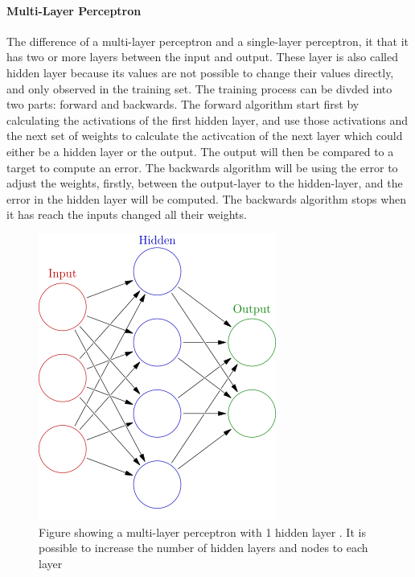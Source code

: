 \documentclass[USenglish]{ifimaster}  %
\begin{document}
\paragraph{Multi-Layer Perceptron}
The difference of a multi-layer perceptron and a single-layer perceptron, it that it has two or more layers between the input and output. These layer is also called hidden layer because its values are not possible to change their values directly, and only observed in the training set. The training process can be divded into two parts: forward and backwards. The forward algorithm start first by calculating the activations of the first hidden layer, and use those activations and the next set of weights to calculate the activcation of the next layer which could either be a hidden layer or the output. The output will then be compared to a target to compute an error. The backwards algorithm will be using the error to adjust the weights, firstly, between the output-layer to the hidden-layer, and the error in the hidden layer will be computed. The backwards algorithm stops when it has reach the inputs changed all their weights.


\begin{figure}[h]
	\centering
	\includegraphics[scale=0.6]{Figures/MLP.png}
	\caption{Figure showing a multi-layer perceptron with 1 hidden layer \cite{MLP}. It is possible to increase the number of hidden layers and nodes to each layer}
	\label{fig:MLP}
\end{figure}
\end{document}
